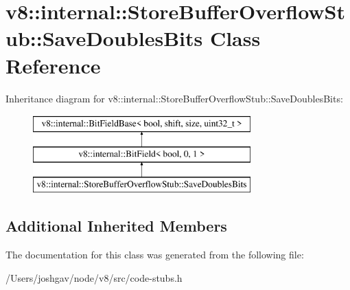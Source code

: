 \hypertarget{classv8_1_1internal_1_1_store_buffer_overflow_stub_1_1_save_doubles_bits}{}\section{v8\+:\+:internal\+:\+:Store\+Buffer\+Overflow\+Stub\+:\+:Save\+Doubles\+Bits Class Reference}
\label{classv8_1_1internal_1_1_store_buffer_overflow_stub_1_1_save_doubles_bits}
Inheritance diagram for v8\+:\+:internal\+:\+:Store\+Buffer\+Overflow\+Stub\+:\+:Save\+Doubles\+Bits\+:\begin{figure}[H]
\begin{center}
\leavevmode
\includegraphics[height=3.000000cm]{classv8_1_1internal_1_1_store_buffer_overflow_stub_1_1_save_doubles_bits}
\end{center}
\end{figure}
\subsection*{Additional Inherited Members}


The documentation for this class was generated from the following file\+:\begin{DoxyCompactItemize}
\item 
/\+Users/joshgav/node/v8/src/code-\/stubs.\+h\end{DoxyCompactItemize}
